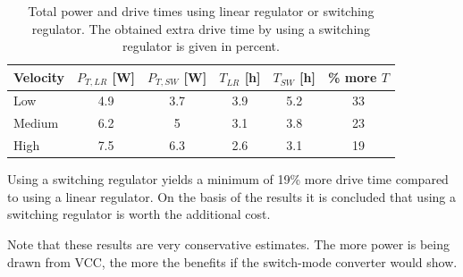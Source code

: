 \begin{table}[h]
	\centering
	\caption{Total power and drive times using linear regulator or switching regulator. The obtained extra drive time by using a switching regulator is given in percent.}
	\label{tab:drive_time}
	\begin{tabular}{|l|c|c|c|c|c|}
		\hline
		\textbf{Velocity} & $P_{T,LR}$ [W]& $P_{T,SW}$ [W]& $T_{LR}$ [h]& $T_{SW}$ [h]& \% \textbf{more} $T$ \\ \hline
		Low       	& 4.9                         & 3.7                               & 3.9              & 5.2                      & 33                 \\ \hline
		Medium  	& 6.2                         & 5                                 & 3.1              & 3.8                      & 23                 \\ \hline
		High      	& 7.5                         & 6.3                               & 2.6              & 3.1                      & 19                 \\ \hline
	\end{tabular}
\end{table}

Using a switching regulator yields a minimum of 19\% more drive time compared to using a linear regulator.
On the basis of the results it is concluded that using a switching regulator is worth the additional cost.

Note that these results are very conservative estimates.
The more power is being drawn from VCC, the more the benefits if the switch-mode converter would show. 
